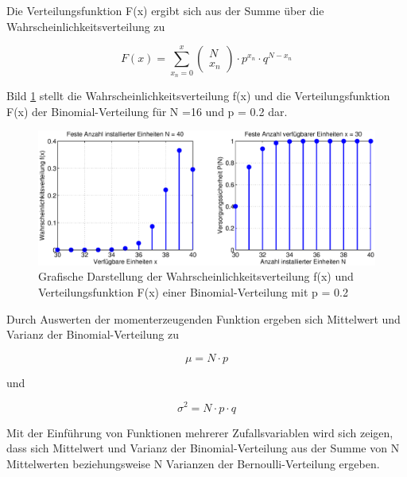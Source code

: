 \noindent Die Verteilungsfunktion F(x) ergibt sich aus der Summe \"{u}ber die Wahrscheinlichkeitsverteilung zu

\begin{equation}\label{eq:fourhundredthirtyone}
F(x)=\sum _{x_{n} =0}^{x}\left(\begin{array}{l} {N} \\ 
{x_{n} } \end{array}\right)\cdot p^{x_{n}} \cdot q^{N-x_{n}} 
\end{equation}

\noindent Bild \ref{fig:Diskret_Binomial2} stellt die Wahrscheinlichkeitsverteilung f(x) und die Verteilungsfunktion F(x) der Binomial-Verteilung f\"{u}r N =16 und p = 0.2 dar.

\noindent 
\begin{figure}[H]
  \centerline{\includegraphics[width=1\textwidth]{Kapitel4/Bilder/image13}}
  \caption{Grafische Darstellung der Wahrscheinlichkeitsverteilung f(x) und Verteilungsfunktion F(x) einer Binomial-Verteilung mit p = 0.2}
  \label{fig:Diskret_Binomial2}
\end{figure}

\noindent Durch Auswerten der momenterzeugenden Funktion ergeben sich Mittelwert und Varianz der Binomial-Verteilung zu

\begin{equation}\label{eq:fourhundredthirtytwo}
\mu =N\cdot p
\end{equation}

\noindent und

\begin{equation}\label{eq:fourhundredthirtythree}
\sigma ^{2} =N\cdot p\cdot q
\end{equation}

\noindent Mit der Einf\"{u}hrung von Funktionen mehrerer Zufallsvariablen wird sich zeigen, dass sich Mittelwert und Varianz der Binomial-Verteilung aus der Summe von N Mittelwerten beziehungsweise N Varianzen der Bernoulli-Verteilung ergeben.

